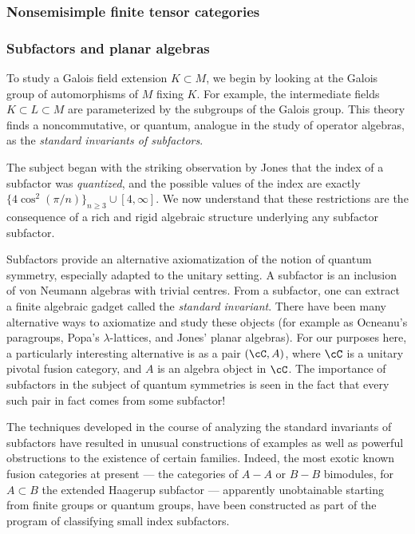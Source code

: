 \documentclass[11pt]{article}
\begin{document}
\subsubsection{Nonsemisimple finite tensor categories}

\subsubsection{Subfactors and planar algebras}

To study a Galois field extension $K \subset M$, we begin by looking at the
Galois group of automorphisms of $M$ fixing $K$. For example, the intermediate
fields $K \subset L \subset M$ are parameterized by the subgroups of the
Galois group. This theory finds a noncommutative, or quantum, analogue in the
study of operator algebras, as the \emph{standard invariants of subfactors}.

The subject began with the striking observation by Jones that the index of a
subfactor was \emph{quantized}, and the possible values of the index are
exactly $\{4 \cos^2(\pi/n)\}_{n \geq 3} \cup [4,\infty]$. We now understand
that these restrictions are the consequence of a rich and rigid algebraic
structure underlying any subfactor subfactor.

Subfactors provide an alternative axiomatization of the notion of quantum
symmetry, especially adapted to the unitary setting. A subfactor is an
inclusion of von Neumann algebras with trivial centres. From a subfactor, one
can extract a finite algebraic gadget called the \emph{standard invariant}.
There have been many alternative ways to axiomatize and study these objects
(for example as Ocneanu's paragroups, Popa's $\lambda$-lattices, and Jones'
planar algebras). For our purposes here, a particularly interesting
alternative is as a pair $(\cC, A)$, where $\cC$ is a unitary pivotal fusion
category, and $A$ is an algebra object in $\cC$. The importance of subfactors
in the subject of quantum symmetries is seen in the fact that every such pair
in fact comes from some subfactor!

The techniques developed in the course of analyzing the standard invariants of
subfactors have resulted in unusual constructions of examples as well as
powerful obstructions to the existence of certain families. Indeed, the most
exotic known fusion categories at present --- the categories of $A-A$ or $B-B$
bimodules, for $A \subset B$ the extended Haagerup subfactor --- apparently
unobtainable starting from finite groups or quantum groups, have been
constructed as part of the program of classifying small index subfactors.
\end{document}
